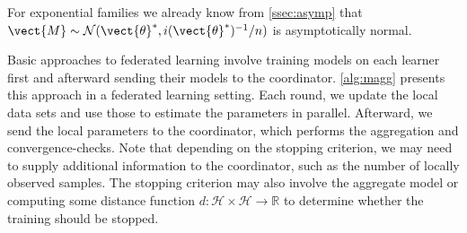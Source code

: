 For exponential families we already know from  \autoref{ssec:asymp} that $\vect{M} \sim \mathcal{N}(\vect{\theta}^*, i(\vect{\theta}^*)^{-1}/n)$ is asymptotically normal.

Basic approaches to federated learning involve training models on each learner first and afterward sending their models to the coordinator.
\autoref{alg:magg} presents this approach in a federated learning setting. 
Each round, we update the local data sets and use those to estimate the parameters in parallel. 
Afterward, we send the local parameters to the coordinator, which performs the aggregation and convergence-checks.
Note that depending on the stopping criterion, we may need to supply additional information to the coordinator, such as the number of locally observed samples. 
The stopping criterion may also involve the aggregate model or computing some distance function $d: \mathcal{H} \times \mathcal{H}  \rightarrow \mathbb{R}$  to determine whether the training should be stopped.
